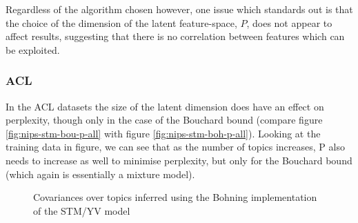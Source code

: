 Regardless of the algorithm chosen however, one issue which standards out is that the choice of the dimension of the latent feature-space, $P$, does not appear to affect results, suggesting that there is no correlation between features which can be exploited.



\subsubsection*{ACL}
In the ACL datasets the size of the latent dimension does have an effect on perplexity, though only in the case of the Bouchard bound (compare figure \ref{fig:nips-stm-bou-p-all} with figure \ref{fig:nips-stm-boh-p-all}). Looking at the training data in figure, we can see that as the number of topics increases, P also needs to increase as well to minimise perplexity, but only for the Bouchard bound (which again is essentially a mixture model).


\begin{figure}
\centering     %
{}
\caption{Covariances over topics inferred using the Bohning implementation of the STM/YV model}
\end{figure}

